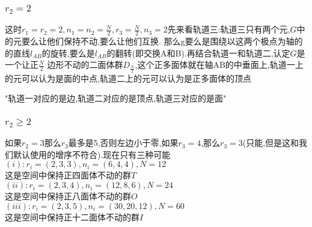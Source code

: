 \documentclass{article}
\begin{document}
            \subsubsection{$r_2=2$}
                这时$r_1=r_2=2,n_1=n_2=\frac{N}{2},r_3=\frac{N}{2},n_3=2$先来看轨道三:轨道三只有两个元,$G$中的元要么让他们保持不动,要么让他们互换.
                那么g要么是围绕以这两个极点为轴的的直线$l_{AB}$的旋转,要么是$l_{AB}$的翻转(即交换A和B).再结合轨道一和轨道二,认定$G$是一个让正$\frac{N}{2}$
                边形不动的二面体群$D_{\frac{N}{2}}$,这个正多面体就在轴AB的中垂面上,轨道一上的元可以认为是面的中点,轨道二上的元可以认为是正多面体的顶点

            "轨道一对应的是边,轨道二对应的是顶点,轨道三对应的是面"

            \subsubsection{$r_2 \ge 2$}
                如果$r_2=3$那么$r_3$最多是5,否则左边小于零,如果$r_3=4$,那么$r_3=3$(只能,但是这和我们默认使用的增序不符合).现在只有三种可能\\
                $(i):r_i=(2,3,3),n_i=(6,4,4),N=12$\\
                这是空间中保持正四面体不动的群$T$\\
                $(ii):r_i=(2,3,4),n_i=(12,8,6),N=24$\\
                这是空间中保持正八面体不动的群$O$\\
                $(iii):r_i=(2,3,5),n_i=(30,20,12),N=60$\\
                这是空间中保持正十二面体不动的群$I$\\

\end{document}
